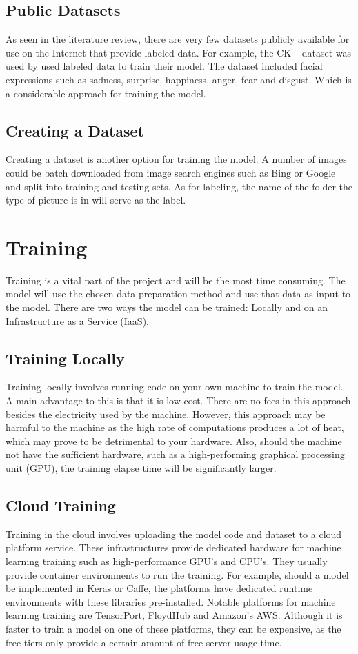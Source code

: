 \subsection{Public Datasets}
As seen in the literature review, there are very few datasets publicly available for use on the Internet that provide labeled data. For example, the CK+ dataset was used by \citeauthor{LOPES} used labeled data to train their model. The dataset included facial expressions such as sadness, surprise, happiness, anger, fear and disgust. Which is a considerable approach for training the model.

\subsection{Creating a Dataset}
Creating a dataset is another option for training the model. A number of images could be batch downloaded from image search engines such as Bing or Google and split into training and testing sets. As for labeling, the name of the folder the type of picture is in will serve as the label.

\section{Training}
Training is a vital part of the project and will be the most time consuming. The model will use the chosen data preparation method and use that data as input to the model. There are two ways the model can be trained: Locally and on an Infrastructure as a Service (IaaS).

\subsection{Training Locally}
Training locally involves running code on your own machine to train the model. A main advantage to this is that it is low cost. There are no fees in this approach besides the electricity used by the machine. However, this approach may be harmful to the machine as the high rate of computations produces a lot of heat, which may prove to be detrimental to your hardware. Also, should the machine not have the sufficient hardware, such as a high-performing graphical processing unit (GPU), the training elapse time will be significantly larger.

\subsection{Cloud Training}
Training in the cloud involves uploading the model code and dataset to a cloud platform service. These infrastructures provide dedicated hardware for machine learning training such as high-performance GPU's and CPU's. They usually provide container environments to run the training. For example, should a model be implemented in Keras or Caffe, the platforms have dedicated runtime environments with these libraries pre-installed. Notable platforms for machine learning training are TensorPort, FloydHub and Amazon's AWS. Although it is faster to train a model on one of these platforms, they can be expensive, as the free tiers only provide a certain amount of free server usage time.

